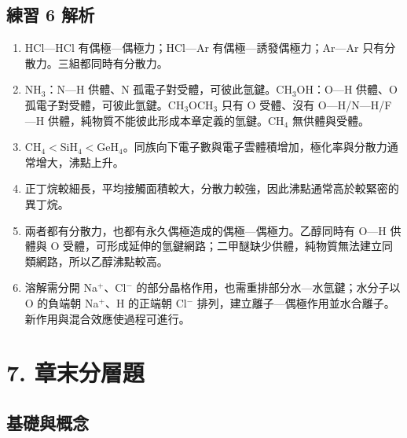 \documentclass[11pt,a4paper]{article}
\providecommand{\tightlist}{%
  \setlength{\itemsep}{0pt}\setlength{\parskip}{0pt}}
\begin{document}
\subsection{練習 6 解析}\label{ux7df4ux7fd2-6-ux89e3ux6790}

\begin{enumerate}
\def\labelenumi{\arabic{enumi}.}
\tightlist
\item
  HCl---HCl 有偶極---偶極力；HCl---Ar 有偶極---誘發偶極力；Ar---Ar 只有分散力。三組都同時有分散力。
\item
  NH\(_3\)：N---H 供體、N 孤電子對受體，可彼此氫鍵。CH\(_3\)OH：O---H 供體、O 孤電子對受體，可彼此氫鍵。CH\(_3\)OCH\(_3\) 只有 O 受體、沒有 O---H/N---H/F---H 供體，純物質不能彼此形成本章定義的氫鍵。CH\(_4\) 無供體與受體。
\item
  CH\(_4<\)SiH\(_4<\)GeH\(_4\)。同族向下電子數與電子雲體積增加，極化率與分散力通常增大，沸點上升。
\item
  正丁烷較細長，平均接觸面積較大，分散力較強，因此沸點通常高於較緊密的異丁烷。
\item
  兩者都有分散力，也都有永久偶極造成的偶極---偶極力。乙醇同時有 O---H 供體與 O 受體，可形成延伸的氫鍵網路；二甲醚缺少供體，純物質無法建立同類網路，所以乙醇沸點較高。
\item
  溶解需分開 Na\(^+\)、Cl\(^-\) 的部分晶格作用，也需重排部分水---水氫鍵；水分子以 O 的負端朝 Na\(^+\)、H 的正端朝 Cl\(^-\) 排列，建立離子---偶極作用並水合離子。新作用與混合效應使過程可進行。
\end{enumerate}

\section{7. 章末分層題}\label{ux7ae0ux672bux5206ux5c64ux984c}

\subsection{基礎與概念}\label{ux57faux790eux8207ux6982ux5ff5}
\end{document}
